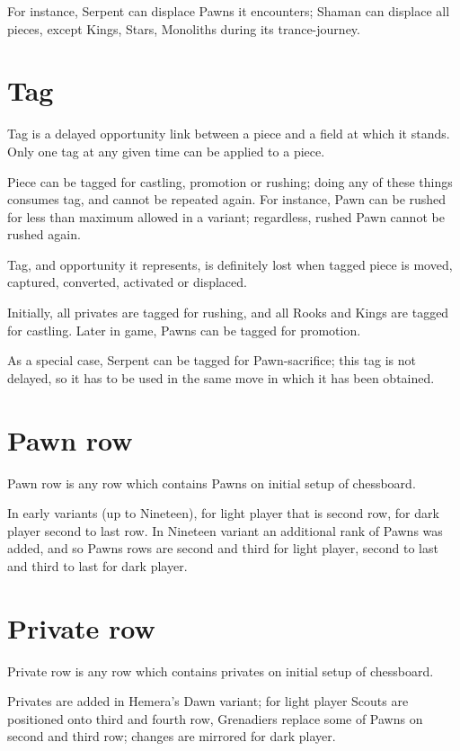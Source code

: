 For instance, Serpent can displace Pawns it encounters; Shaman can displace
all pieces, except Kings, Stars, Monoliths during its trance-journey.

\section*{Tag}
\label{sec:Terms/Tag}
Tag is a delayed opportunity link between a piece and a field at which it stands.
Only one tag at any given time can be applied to a piece.

Piece can be tagged for castling, promotion or rushing; doing any of these things
consumes tag, and cannot be repeated again. For instance, Pawn can be rushed for
less than maximum allowed in a variant; regardless, rushed Pawn cannot be rushed
again.

Tag, and opportunity it represents, is definitely lost when tagged piece is moved,
captured, converted, activated or displaced.

Initially, all privates are tagged for rushing, and all Rooks and Kings are tagged
for castling. Later in game, Pawns can be tagged for promotion.

As a special case, Serpent can be tagged for Pawn-sacrifice; this tag is not
delayed, so it has to be used in the same move in which it has been obtained.

\section*{Pawn row}
\label{sec:Terms/Pawn row}
Pawn row is any row which contains Pawns on initial setup of chessboard.

In early variants (up to Nineteen), for light player that is second row, for
dark player second to last row. In Nineteen variant an additional rank of
Pawns was added, and so Pawns rows are second and third for light player,
second to last and third to last for dark player.

\section*{Private row}
\label{sec:Terms/Private row}
Private row is any row which contains privates on initial setup of chessboard.

Privates are added in Hemera's Dawn variant; for light player Scouts are positioned
onto third and fourth row, Grenadiers replace some of Pawns on second and third row;
changes are mirrored for dark player.

